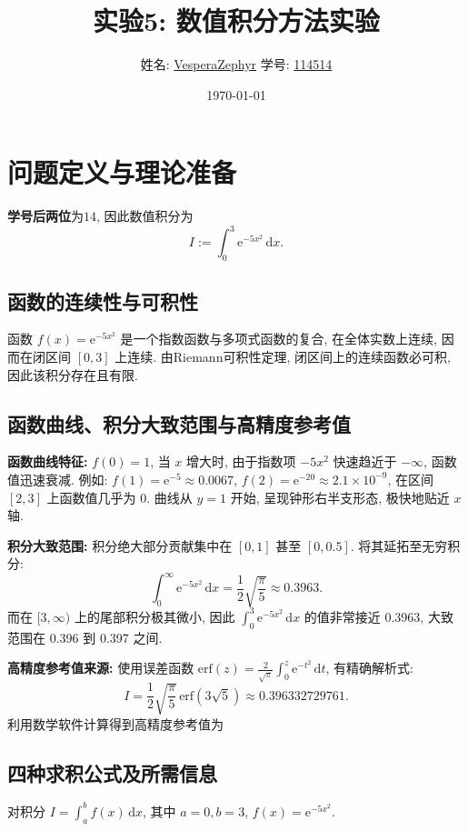 \documentclass[12pt,a4paper]{ctexart}
\title{\textbf{实验5: 数值积分方法实验}}
\author{姓名: \underline{VesperaZephyr} \quad 学号: \underline{114514}}
\date{\today}
\newcommand{\myS}{14}
\begin{document}
\maketitle
\tableofcontents
\newpage

\section{问题定义与理论准备}
\textbf{学号后两位}为$\myS$, 因此数值积分为\[I:=\int_0^3 \mathrm{e}^{-5x^2}\,\mathrm{d}x.\]
\subsection*{函数的连续性与可积性}
函数 $f(x) = \mathrm{e}^{-5x^2}$ 是一个指数函数与多项式函数的复合, 在全体实数上连续, 因而在闭区间 $[0,3]$ 上连续. 由Riemann可积性定理, 闭区间上的连续函数必可积, 因此该积分存在且有限. 

\subsection{函数曲线、积分大致范围与高精度参考值}
\textbf{函数曲线特征: }  
$f(0)=1$, 当 $x$ 增大时, 由于指数项 $-5x^2$ 快速趋近于 $-\infty$, 函数值迅速衰减. 例如: 
$f(1)=\mathrm{e}^{-5}\approx 0.0067$, 
$f(2)=\mathrm{e}^{-20}\approx 2.1\times10^{-9}$, 
在区间 $[2,3]$ 上函数值几乎为 0. 曲线从 $y=1$ 开始, 呈现钟形右半支形态, 极快地贴近 $x$ 轴. 

\textbf{积分大致范围: }  
积分绝大部分贡献集中在 $[0,1]$ 甚至 $[0,0.5]$. 将其延拓至无穷积分: 
\[
\int_0^\infty \mathrm{e}^{-5x^2}\,\mathrm{d}x = \frac{1}{2}\sqrt{\frac{\pi}{5}} \approx 0.3963.
\]
而在 $[3,\infty)$ 上的尾部积分极其微小, 因此 $\int_0^3 \mathrm{e}^{-5x^2}\,\mathrm{d}x$ 的值非常接近 0.3963, 大致范围在 0.396 到 0.397 之间. 

\textbf{高精度参考值来源: }  
使用误差函数 $\mathrm{erf}(z) = \frac{2}{\sqrt{\pi}}\int_0^z \mathrm{e}^{-t^2}\,\mathrm{d}t$, 有精确解析式: 
\[
I = \frac{1}{2}\sqrt{\frac{\pi}{5}}\,\mathrm{erf}(3\sqrt{5})\approx 0.396332729761.
\]
利用数学软件计算得到高精度参考值为

\subsection*{四种求积公式及所需信息}
对积分 $I = \int_a^b f(x)\,\mathrm{d}x$, 其中 $a=0, b=3$, $f(x)=\mathrm{e}^{-5x^2}$. 
\end{document}
